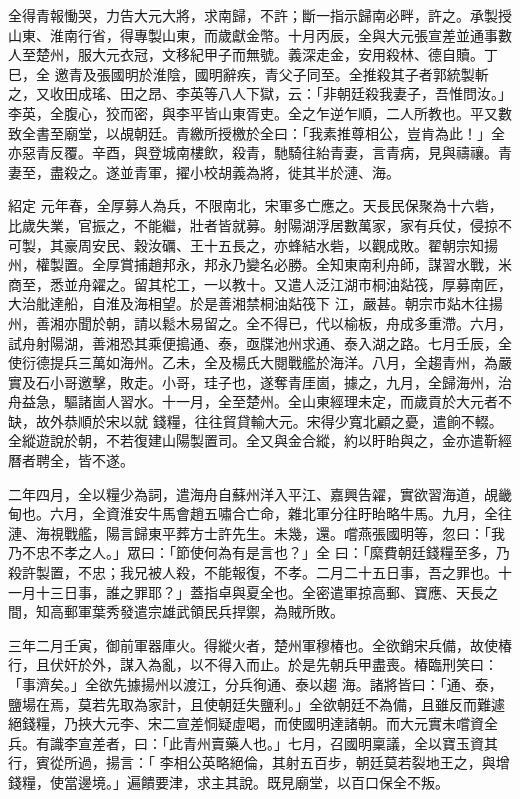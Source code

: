 \begin{pinyinscope}
 全得青報慟哭，力告大元大將，求南歸，不許；斷一指示歸南必畔，許之。承製授山東、淮南行省，得專製山東，而歲獻金幣。十月丙辰，全與大元張宣差並通事數人至楚州，服大元衣冠，文移紀甲子而無號。義深走金，安用殺林、德自贖。丁巳，全
 邀青及張國明於淮陰，國明辭疾，青父子同至。全推殺其子者郭統製斬之，又收田成瑤、田之昂、李英等八人下獄，云：「非朝廷殺我妻子，吾惟問汝。」李英，全腹心，狡而密，與李平皆山東胥吏。全之乍逆乍順，二人所教也。平又數致全書至廟堂，以覘朝廷。青繳所授檄於全曰：「我素推尊相公，豈肯為此！」全亦惡青反覆。辛酉，與登城南樓飲，殺青，馳騎往紿青妻，言青病，見與禱禳。青妻至，盡殺之。遂並青軍，擢小校胡義為將，徙其半於漣、海。



 紹定
 元年春，全厚募人為兵，不限南北，宋軍多亡應之。天長民保聚為十六砦，比歲失業，官振之，不能繼，壯者皆就募。射陽湖浮居數萬家，家有兵仗，侵掠不可製，其豪周安民、穀汝礪、王十五長之，亦蜂結水砦，以觀成敗。翟朝宗知揚州，權製置。全厚賞捕趙邦永，邦永乃變名必勝。全知東南利舟師，謀習水戰，米商至，悉並舟糴之。留其柁工，一以教十。又遣人泛江湖市桐油煔筏，厚募南匠，大治舭達船，自淮及海相望。於是善湘禁桐油煔筏下
 江，嚴甚。朝宗市煔木往揚州，善湘亦聞於朝，請以鬆木易留之。全不得已，代以榆板，舟成多重滯。六月，試舟射陽湖，善湘恐其乘便搗通、泰，亟牒池州求通、泰入湖之路。七月壬辰，全使衍德提兵三萬如海州。乙未，全及楊氏大閱戰艦於海洋。八月，全趨青州，為嚴實及石小哥邀擊，敗走。小哥，珪子也，遂奪青厓崮，據之，九月，全歸海州，治舟益急，驅諸崮人習水。十一月，全至楚州。全山東經理未定，而歲貢於大元者不缺，故外恭順於宋以就
 錢糧，往往貿貸輸大元。宋得少寬北顧之憂，遣餉不輟。全縱遊說於朝，不若復建山陽製置司。全又與金合縱，約以盱眙與之，金亦遣靳經曆者聘全，皆不遂。



 二年四月，全以糧少為詞，遣海舟自蘇州洋入平江、嘉興告糴，實欲習海道，覘畿甸也。六月，全資淮安牛馬會趙五嘯合亡命，雜北軍分往盱眙略牛馬。九月，全往漣、海視戰艦，陽言歸東平葬方士許先生。未幾，還。嚐燕張國明等，忽曰：「我乃不忠不孝之人。」眾曰：「節使何為有是言也？」全
 曰：「縻費朝廷錢糧至多，乃殺許製置，不忠；我兄被人殺，不能報復，不孝。二月二十五日事，吾之罪也。十一月十三日事，誰之罪耶？」蓋指卓與夏全也。全密遣軍掠高郵、寶應、天長之間，知高郵軍葉秀發遣宗雄武領民兵捍禦，為賊所敗。



 三年二月壬寅，御前軍器庫火。得縱火者，楚州軍穆椿也。全欲銷宋兵備，故使椿行，且伏奸於外，謀入為亂，以不得入而止。於是先朝兵甲盡喪。椿臨刑笑曰：「事濟矣。」全欲先據揚州以渡江，分兵徇通、泰以趨
 海。諸將皆曰：「通、泰，鹽場在焉，莫若先取為家計，且使朝廷失鹽利。」全欲朝廷不為備，且雖反而難遽絕錢糧，乃挾大元李、宋二宣差恫疑虛喝，而使國明達諸朝。而大元實未嚐資全兵。有識李宣差者，曰：「此青州賣藥人也。」七月，召國明稟議，全以寶玉資其行，賓從所過，揚言：「 李相公英略絕倫，其射五百步，朝廷莫若裂地王之，與增錢糧，使當邊境。」遍饋要津，求主其說。既見廟堂，以百口保全不叛。




\end{pinyinscope}
